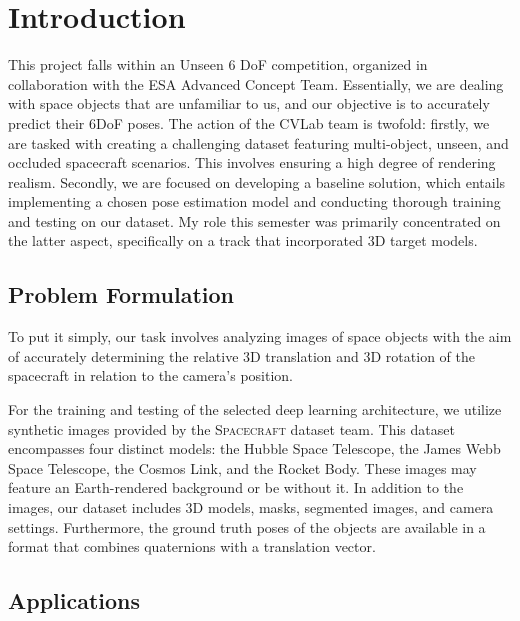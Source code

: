 
\chapter{Introduction}\label{chapter:introduction}
\renewcommand{\headrulewidth}{0.4pt}

This project falls within an Unseen 6 \ac{DoF} competition, organized in collaboration with the \ac{ESA} Advanced Concept Team. Essentially, we are dealing with space objects that are unfamiliar to us, and our objective is to accurately predict their 6\ac{DoF} poses. The action of the \ac{CVLab} team is twofold: firstly, we are tasked with creating a challenging dataset featuring multi-object, unseen, and occluded spacecraft scenarios. This involves ensuring a high degree of rendering realism. Secondly, we are focused on developing a baseline solution, which entails implementing a chosen pose estimation model and conducting thorough training and testing on our dataset. My role this semester was primarily concentrated on the latter aspect, specifically on a track that incorporated 3D target models.

\section{Problem Formulation}

To put it simply, our task involves analyzing images of space objects with the aim of accurately determining the relative 3D translation and 3D rotation of the spacecraft in relation to the camera's position.

For the training and testing of the selected deep learning architecture, we utilize synthetic images provided by the \textsc{Spacecraft} dataset team. This dataset encompasses four distinct models: the Hubble Space Telescope, the James Webb Space Telescope, the Cosmos Link, and the Rocket Body. These images may feature an Earth-rendered background or be without it. In addition to the images, our dataset includes 3D models, masks, segmented images, and camera settings. Furthermore, the ground truth poses of the objects are available in a format that combines quaternions with a translation vector.

\section{Applications}

